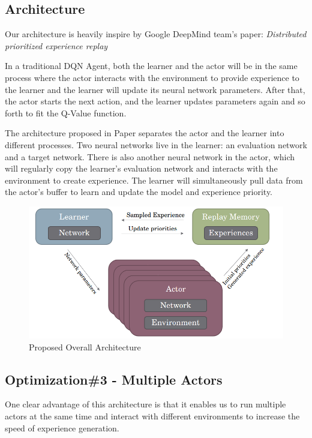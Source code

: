\documentclass[sigconf]{acmart}
\begin{document}
\subsection{Architecture}
Our architecture is heavily inspire by Google DeepMind team’s paper: \textit{Distributed prioritized experience replay}\cite{horgan2018distributed}

In a traditional DQN Agent, both the learner and the actor will be in the same process where the actor interacts with the environment to provide experience to the learner and the learner will update its neural network parameters. After that, the actor starts the next action, and the learner updates parameters again and so forth to fit the Q-Value function.

The architecture proposed in Paper separates the actor and the learner into different processes. Two neural networks live in the learner: an evaluation network and a target network.  There is also another neural network in the actor, which will regularly copy the learner's evaluation network and interacts with the environment to create experience. The learner will simultaneously pull data from the actor's buffer to learn and update the model and experience priority.
\begin{figure}[h]
  \centering
  \includegraphics[width=\columnwidth]{arch.png}
  \caption{Proposed Overall Architecture}
\end{figure}

\subsection*{Optimization\#3 - Multiple Actors}
One clear advantage of this architecture is that it enables us to run multiple actors at the same time and interact with different environments to increase the speed of experience generation.
\end{document}
